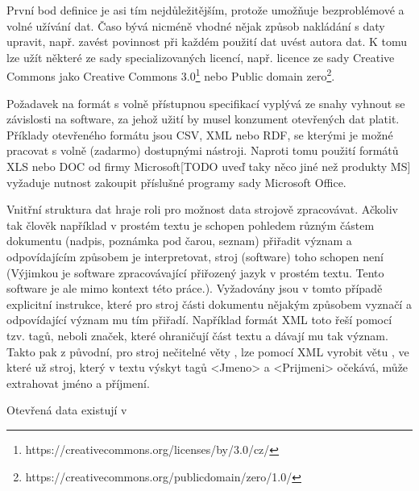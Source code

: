 První bod definice je asi tím nejdůležitějším, protože umožňuje bezproblémové a volné užívání dat. Časo bývá nicméně vhodné nějak způsob nakládání s daty upravit, např. zavést povinnost při každém použití dat uvést autora dat. K tomu lze užít některé ze sady specializovaných licencí, např. licence ze sady Creative Commons jako Creative Commons 3.0\footnote{https://creativecommons.org/licenses/by/3.0/cz/} nebo Public domain zero\footnote{https://creativecommons.org/publicdomain/zero/1.0/}.

Požadavek na formát s volně přístupnou specifikací vyplývá ze snahy vyhnout se závislosti na software, za jehož užití by musel konzument otevřených dat platit. Příklady otevřeného formátu jsou CSV, XML nebo RDF, se kterými je možné pracovat s volně (zadarmo) dostupnými nástroji. Naproti tomu použití formátů XLS nebo DOC od firmy Microsoft[TODO uveď taky něco jiné než produkty MS] vyžaduje nutnost zakoupit příslušné programy sady Microsoft Office.

Vnitřní struktura dat hraje roli pro možnost data strojově zpracovávat. Ačkoliv tak člověk například v prostém textu je schopen pohledem různým částem dokumentu (nadpis, poznámka pod čarou, seznam) přiřadit význam a odpovídajícím způsobem je interpretovat, stroj (software) toho schopen není (Výjimkou je software zpracovávající přiřozený jazyk v prostém textu. Tento software je ale mimo kontext této práce.). Vyžadovány jsou v tomto případě explicitní instrukce, které pro stroj části dokumentu nějakým způsobem vyznačí a odpovídající význam mu tím přiřadí. Například formát XML toto řeší pomocí tzv. tagů, neboli značek, které ohraničují část textu a dávají mu tak význam. Takto pak z původní, pro stroj nečitelné věty , lze pomocí XML vyrobit větu , ve které už stroj, který v textu výskyt tagů <Jmeno> a <Prijmeni> očekává, může extrahovat jméno a příjmení.

Otevřená data existují v
